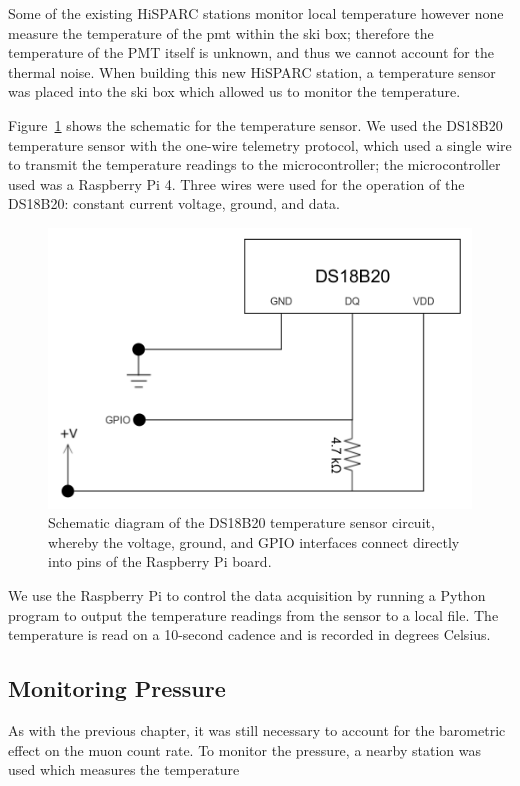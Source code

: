 Some of the existing HiSPARC stations monitor local temperature however none measure the temperature of the \gls{pmt} within the ski box; therefore the temperature of the PMT itself is unknown, and thus we cannot account for the thermal noise. When building this new HiSPARC station, a temperature sensor was placed into the ski box which allowed us to monitor the temperature.

Figure~\ref{fig:temperature_sensor_circuit} shows the schematic for the temperature sensor. We used the DS18B20 temperature sensor with the one-wire telemetry protocol, which used a single wire to transmit the temperature readings to the microcontroller; the microcontroller used was a Raspberry Pi 4. Three wires were used for the operation of the DS18B20: constant current voltage, ground, and data.

\begin{figure}
	\centering
	\includegraphics[width=0.6\columnwidth]{HS_14008_temp_circuit.png}
	\caption{Schematic diagram of the DS18B20 temperature sensor circuit, whereby the voltage, ground, and GPIO interfaces connect directly into pins of the Raspberry Pi board.}
	\label{fig:temperature_sensor_circuit}
\end{figure}

We use the Raspberry Pi to control the data acquisition by running a Python program to output the temperature readings from the sensor to a local file. The temperature is read on a 10-second cadence and is recorded in degrees Celsius.



\subsection{Monitoring Pressure}

As with the previous chapter, it was still necessary to account for the barometric effect on the muon count rate. To monitor the pressure, a nearby station was used which measures the temperature 





